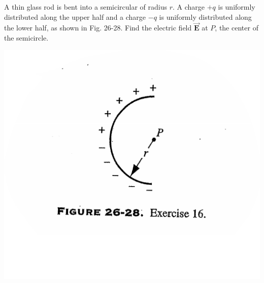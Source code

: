 \documentclass[12pt,letterpaper,boxed,cm]{hmcpset}
\begin{document}
\begin{problem}[26-E16]
  A thin glass rod is bent into a semicircular of radius $r$. A charge $+q$
  is uniformly distributed along the upper half and a charge $-q$ is uniformly
  distributed along the lower half, as shown in Fig. 26-28. Find the electric field
  $\vec{\mathbf{E}}$ at $P$, the center of the semicircle.
  \begin{center}
    \includegraphics[scale=0.6]{02.png}
  \end{center}
\end{problem}
\begin{solution}
\end{solution}
\newpage
\end{document}
